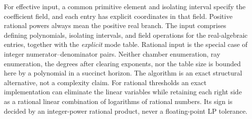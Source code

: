 For effective input, a common primitive element and isolating interval specify the coefficient field, and each entry has explicit coordinates in that field. Positive rational powers always mean the positive real branch. The input comprises defining polynomials, isolating intervals, and
field operations for the real-algebraic entries, together with the
\emph{explicit} mode table. Rational input is the special case of
integer numerator--denominator pairs. Neither chamber enumeration,
ray enumeration, the degrees after clearing exponents, nor the table
size is bounded here by a polynomial in a succinct horizon. The
algorithm is an exact structural alternative, not a complexity claim.
For rational thresholds an exact implementation can eliminate the
linear variables while retaining each right side as a rational linear
combination of logarithms of rational numbers. Its sign is decided by
an integer-power rational product, never a floating-point LP tolerance.
